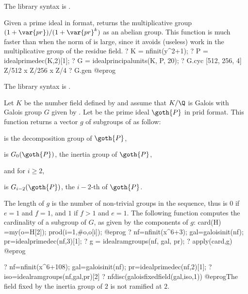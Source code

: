 The library syntax is .

\label{se:idealprincipalunits}
Given a prime ideal in  format,
returns the multiplicative group $(1 + \var{pr}) / (1 + \var{pr}^k)$ as an
abelian group. This function is much faster than  when the
norm of  is large, since it avoids (useless) work in the
multiplicative group of the residue field.
\bprog
? K = nfinit(y^2+1);
? P = idealprimedec(K,2)[1];
? G = idealprincipalunits(K, P, 20);
? G.cyc
[512, 256, 4]   \\ Z/512 x Z/256 x Z/4
? G.gen
@eprog

The library syntax is .

\label{se:idealramgroups}
Let $K$ be the number field defined by  and assume that $K/\Q$ is
Galois with Galois group $G$ given by .
Let  be the prime ideal $\goth{P}$ in prid format.
This function returns a vector $g$ of subgroups of 
as follow:

\item {} is the decomposition group of $\goth{P}$,

\item {} is $G_0(\goth{P})$, the inertia group of $\goth{P}$,

and for $i\geq 2$,

\item {} is $G_{i-2}(\goth{P})$, the $i-2$-th  of $\goth{P}$.

\noindent The length of $g$ is the number of non-trivial groups in the
sequence, thus is $0$ if $e=1$ and $f=1$, and $1$ if $f>1$ and $e=1$.
The following function computes the cardinality of a subgroup of $G$,
as given by the components of $g$:
\bprog
card(H) =my(o=H[2]); prod(i=1,#o,o[i]);
@eprog
\bprog
? nf=nfinit(x^6+3); gal=galoisinit(nf); pr=idealprimedec(nf,3)[1];
? g = idealramgroups(nf, gal, pr);
? apply(card,g)
@eprog

\bprog
? nf=nfinit(x^6+108); gal=galoisinit(nf); pr=idealprimedec(nf,2)[1];
? iso=idealramgroups(nf,gal,pr)[2]
? nfdisc(galoisfixedfield(gal,iso,1))
@eprog\noindent The field fixed by the inertia group of $2$ is not ramified at
$2$.

